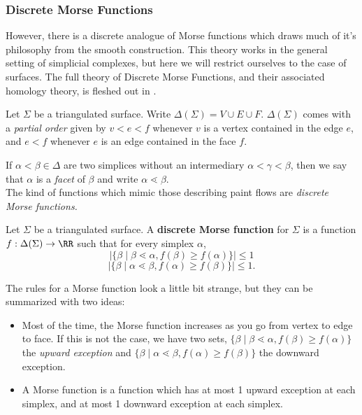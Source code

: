 \subsubsection{Discrete Morse Functions}
\begin{projectdescription}
However, there is a discrete analogue of Morse functions which draws much of it's philosophy from the smooth construction.\label{proj:morsetheory} This theory works in the general setting of simplicial complexes, but here we will restrict ourselves to the case of surfaces. The full theory of Discrete Morse Functions, and their associated homology theory, is fleshed out in \cite{forman2002user}. 
\end{projectdescription}
\begin{definition}
Let $\Sigma$ be a triangulated surface. Write $\Delta(\Sigma)= V\cup E\cup F$. $\Delta(\Sigma)$ comes with a \emph{partial order} given by $v<e<f$ whenever $v$ is a vertex contained in the edge $e$, and $e<f$ whenever $e$ is an edge contained in the face $f$. \\
\end{definition}
If $\alpha< \beta \in \Delta$ are two simplices without an intermediary $\alpha<\gamma<\beta$, then we say that $\alpha$ is a \emph{facet} of $\beta$ and write $\alpha\lessdot\beta$. \\
The kind of functions which mimic those describing paint flows are \emph{discrete Morse functions. } 
\begin{definition}
Let $\Sigma$ be a triangulated surface. A \textbf{discrete Morse function} for $\Sigma$ is a function $f: \Delta(\Sigma)\to \RR$ such that for every simplex $\alpha$,
\[|\{\beta \;|\; \beta\lessdot \alpha ,  f(\beta)\geq f(\alpha)\}|\leq 1\]
\[|\{\beta \;|\; \alpha\lessdot \beta ,  f(\alpha)\geq f(\beta)\}|\leq 1.\]
\end{definition}
The rules for a Morse function look a little bit strange, but they can be summarized with two ideas:
\begin{itemize}
\item  Most of the time, the Morse function increases as you go from vertex to edge to face. If this is not the case, we have two sets,  $\{\beta \;|\; \beta\lessdot \alpha ,  f(\beta)\geq f(\alpha)\}$ the \emph{upward exception} and $\{\beta \;|\; \alpha\lessdot \beta ,  f(\alpha)\geq f(\beta)\}$ the downward exception. 
\item A Morse function is a function which has at most 1 upward exception at each simplex, and at most 1 downward exception at each simplex. 
\end{itemize}
